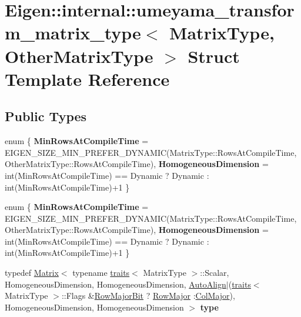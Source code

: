 \hypertarget{struct_eigen_1_1internal_1_1umeyama__transform__matrix__type}{}\section{Eigen\+:\+:internal\+:\+:umeyama\+\_\+transform\+\_\+matrix\+\_\+type$<$ Matrix\+Type, Other\+Matrix\+Type $>$ Struct Template Reference}
\label{struct_eigen_1_1internal_1_1umeyama__transform__matrix__type}
\subsection*{Public Types}
\begin{DoxyCompactItemize}
\item 
\mbox{\label{struct_eigen_1_1internal_1_1umeyama__transform__matrix__type_aa2388e7cc7d2f4c0f5cb930bd7394a57}} 
enum \{ {\bfseries Min\+Rows\+At\+Compile\+Time} = E\+I\+G\+E\+N\+\_\+\+S\+I\+Z\+E\+\_\+\+M\+I\+N\+\_\+\+P\+R\+E\+F\+E\+R\+\_\+\+D\+Y\+N\+A\+M\+IC(Matrix\+Type\+:\+:Rows\+At\+Compile\+Time, Other\+Matrix\+Type\+:\+:Rows\+At\+Compile\+Time), 
{\bfseries Homogeneous\+Dimension} = int(Min\+Rows\+At\+Compile\+Time) == Dynamic ? Dynamic \+: int(Min\+Rows\+At\+Compile\+Time)+1
 \}
\item 
\mbox{\label{struct_eigen_1_1internal_1_1umeyama__transform__matrix__type_a2b2f6b9a8f76cfabc2d73bf80f2ee9b2}} 
enum \{ {\bfseries Min\+Rows\+At\+Compile\+Time} = E\+I\+G\+E\+N\+\_\+\+S\+I\+Z\+E\+\_\+\+M\+I\+N\+\_\+\+P\+R\+E\+F\+E\+R\+\_\+\+D\+Y\+N\+A\+M\+IC(Matrix\+Type\+:\+:Rows\+At\+Compile\+Time, Other\+Matrix\+Type\+:\+:Rows\+At\+Compile\+Time), 
{\bfseries Homogeneous\+Dimension} = int(Min\+Rows\+At\+Compile\+Time) == Dynamic ? Dynamic \+: int(Min\+Rows\+At\+Compile\+Time)+1
 \}
\item 
\mbox{\label{struct_eigen_1_1internal_1_1umeyama__transform__matrix__type_ac9515b0834bee3cf4a9ce0ed3adc9b2c}} 
typedef \hyperlink{group___core___module_class_eigen_1_1_matrix}{Matrix}$<$ typename \hyperlink{struct_eigen_1_1internal_1_1traits}{traits}$<$ Matrix\+Type $>$\+::Scalar, Homogeneous\+Dimension, Homogeneous\+Dimension, \hyperlink{group__enums_ggaacded1a18ae58b0f554751f6cdf9eb13a28d63c0dd8560827162decfd898804f4}{Auto\+Align}$\vert$(\hyperlink{struct_eigen_1_1internal_1_1traits}{traits}$<$ Matrix\+Type $>$\+::Flags \&\hyperlink{group__flags_gae4f56c2a60bbe4bd2e44c5b19cbe8762}{Row\+Major\+Bit} ? \hyperlink{group__enums_ggaacded1a18ae58b0f554751f6cdf9eb13acfcde9cd8677c5f7caf6bd603666aae3}{Row\+Major} \+:\hyperlink{group__enums_ggaacded1a18ae58b0f554751f6cdf9eb13a0cbd4bdd0abcfc0224c5fcb5e4f6669a}{Col\+Major}), Homogeneous\+Dimension, Homogeneous\+Dimension $>$ {\bfseries type}

\end{DoxyCompactItemize}
